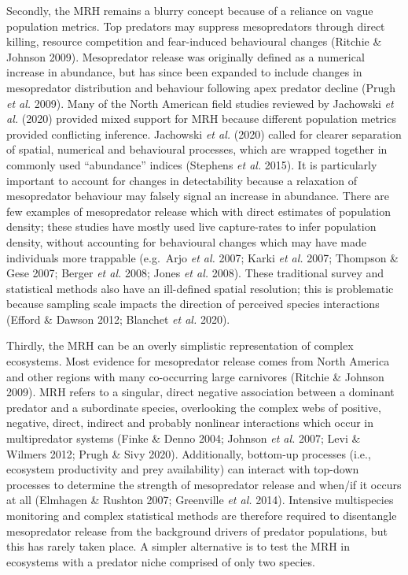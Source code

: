 \documentclass[11pt,a4paper,titlepage,twoside,openright]{style/unimelbthesis}
\begin{document}
\begin{mainmatter}
Secondly, the MRH remains a blurry concept because of a reliance on vague population metrics. Top predators may suppress mesopredators through direct killing, resource competition and fear-induced behavioural changes (Ritchie \& Johnson 2009). Mesopredator release was originally defined as a numerical increase in abundance, but has since been expanded to include changes in mesopredator distribution and behaviour following apex predator decline (Prugh \emph{et al.} 2009). Many of the North American field studies reviewed by Jachowski \emph{et al.} (2020) provided mixed support for MRH because different population metrics provided conflicting inference. Jachowski \emph{et al.} (2020) called for clearer separation of spatial, numerical and behavioural processes, which are wrapped together in commonly used ``abundance'' indices (Stephens \emph{et al.} 2015). It is particularly important to account for changes in detectability because a relaxation of mesopredator behaviour may falsely signal an increase in abundance. There are few examples of mesopredator release which with direct estimates of population density; these studies have mostly used live capture-rates to infer population density, without accounting for behavioural changes which may have made individuals more trappable (e.g.~Arjo \emph{et al.} 2007; Karki \emph{et al.} 2007; Thompson \& Gese 2007; Berger \emph{et al.} 2008; Jones \emph{et al.} 2008). These traditional survey and statistical methods also have an ill-defined spatial resolution; this is problematic because sampling scale impacts the direction of perceived species interactions (Efford \& Dawson 2012; Blanchet \emph{et al.} 2020).

Thirdly, the MRH can be an overly simplistic representation of complex ecosystems. Most evidence for mesopredator release comes from North America and other regions with many co-occurring large carnivores (Ritchie \& Johnson 2009). MRH refers to a singular, direct negative association between a dominant predator and a subordinate species, overlooking the complex webs of positive, negative, direct, indirect and probably nonlinear interactions which occur in multipredator systems (Finke \& Denno 2004; Johnson \emph{et al.} 2007; Levi \& Wilmers 2012; Prugh \& Sivy 2020). Additionally, bottom-up processes (i.e., ecosystem productivity and prey availability) can interact with top-down processes to determine the strength of mesopredator release and when/if it occurs at all (Elmhagen \& Rushton 2007; Greenville \emph{et al.} 2014). Intensive multispecies monitoring and complex statistical methods are therefore required to disentangle mesopredator release from the background drivers of predator populations, but this has rarely taken place. A simpler alternative is to test the MRH in ecosystems with a predator niche comprised of only two species.


\end{mainmatter}
\end{document}
